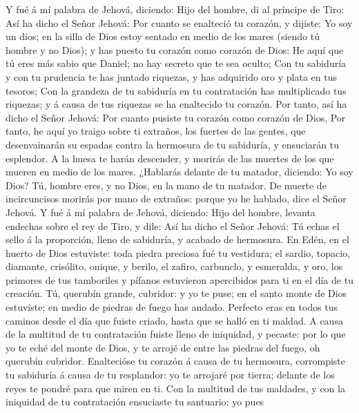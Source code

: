  Y fué á mí palabra de Jehová, diciendo: 
Hijo del hombre, di al príncipe de Tiro: Así ha dicho el Señor Jehová:
Por cuanto se enalteció tu corazón, y dijiste: Yo soy un dios; en la
silla de Dios estoy sentado en medio de los mares (siendo tú hombre y no
Dios); y has puesto tu corazón como corazón de Dios:  He
aquí que tú eres más sabio que Daniel; no hay secreto que te sea oculto;
 Con tu sabiduría y con tu prudencia te has juntado
riquezas, y has adquirido oro y plata en tus tesoros;  Con
la grandeza de tu sabiduría en tu contratación has multiplicado tus
riquezas; y á causa de tus riquezas se ha enaltecido tu corazón.
 Por tanto, así ha dicho el Señor Jehová: Por cuanto
pusiste tu corazón como corazón de Dios,  Por tanto, he
aquí yo traigo sobre ti extraños, los fuertes de las gentes, que
desenvainarán su espadas contra la hermosura de tu sabiduría, y
ensuciarán tu esplendor.  A la huesa te harán descender, y
morirás de las muertes de los que mueren en medio de los mares.
 ¿Hablarás delante de tu matador, diciendo: Yo soy Dios?
Tú, hombre eres, y no Dios, en la mano de tu matador.  De
muerte de incircuncisos morirás por mano de extraños: porque yo he
hablado, dice el Señor Jehová.  Y fué á mí palabra de
Jehová, diciendo:  Hijo del hombre, levanta endechas
sobre el rey de Tiro, y dile: Así ha dicho el Señor Jehová: Tú echas el
sello á la proporción, lleno de sabiduría, y acabado de hermosura.
 En Edén, en el huerto de Dios estuviste: toda piedra
preciosa fué tu vestidura; el sardio, topacio, diamante, crisólito,
onique, y berilo, el zafiro, carbunclo, y esmeralda, y oro, los primores
de tus tamboriles y pífanos estuvieron apercibidos para ti en el día de
tu creación.  Tú, querubín grande, cubridor: y yo te
puse; en el santo monte de Dios estuviste; en medio de piedras de fuego
has andado.  Perfecto eras en todos tus caminos desde el
día que fuiste criado, hasta que se halló en ti maldad. 
A causa de la multitud de tu contratación fuiste lleno de iniquidad, y
pecaste: por lo que yo te eché del monte de Dios, y te arrojé de entre
las piedras del fuego, oh querubín cubridor.  Enaltecióse
tu corazón á causa de tu hermosura, corrompiste tu sabiduría á causa de
tu resplandor: yo te arrojaré por tierra; delante de los reyes te pondré
para que miren en ti.  Con la multitud de tus maldades, y
con la iniquidad de tu contratación ensuciaste tu santuario: yo pues
